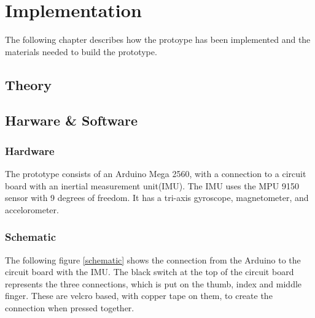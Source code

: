 \chapter{Implementation}

The following chapter describes how the protoype has been implemented and the materials needed to build the prototype. 

\section{Theory}




\section{Harware & Software}

\subsection{Hardware}

The prototype consists of an Arduino Mega 2560\citep{Arduino}, with a connection to a circuit board with an inertial measurement unit(IMU). 
The IMU uses the MPU 9150 sensor with 9 degrees of freedom\citep{MPU}. It has a tri-axis gyroscope, magnetometer, and accelorometer.

\subsection{Schematic} 

The following figure \ref{schematic} shows the connection from the Arduino to the circuit board with the IMU. The black switch at the top of the circuit board
represents the three connections, which is put on the thumb, index and middle finger. These are velcro based, with copper tape on them, to create the connection when pressed together. 

\begin{minipage}{\linewidth}%
\label{schematic}
\end{minipage}\\

